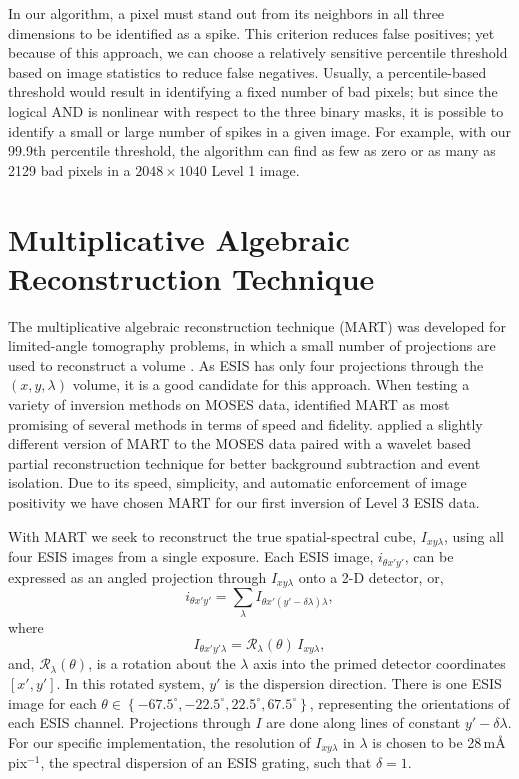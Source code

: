 \documentclass[linenumbers,trackchanges]{aastex63}
\begin{document}
In our algorithm, a pixel must stand out from its neighbors in all three dimensions to be identified as a spike.
This criterion reduces false positives; yet because of this approach, we can choose a relatively sensitive percentile threshold based on image statistics to reduce false negatives. 
Usually, a percentile-based threshold would result in identifying a fixed number of bad pixels; but since the logical AND is nonlinear with respect to the three binary masks, it is possible to identify a small or large number of spikes in a given image. 
For example, with our 99.9th percentile threshold, the algorithm can find as few as zero or as many as 2129 bad pixels in a $2048\times 1040$ Level 1 image.

    	\section{Multiplicative Algebraic Reconstruction Technique}\label{MART}
   	The multiplicative algebraic reconstruction technique (MART) was developed for limited-angle tomography problems, in which a small number of projections are used to reconstruct a volume \citep{Okamoto1991,Verhoeven1993}. 
As ESIS has only four projections through the $(x,y,\lambda)$ volume, it is a good candidate for this approach.
When testing a variety of inversion methods on MOSES data, \citet{Fox2011} identified MART as most promising of several methods in terms of speed and fidelity.
\citet{Rust2017} applied a slightly different version of MART to the MOSES data paired with a wavelet based partial reconstruction technique for better background subtraction and event isolation.
Due to its speed, simplicity, and automatic enforcement of image positivity we have chosen MART for our first inversion of Level 3 ESIS data.


With MART we seek to reconstruct the true spatial-spectral cube, $I_{xy\lambda}$, using all four ESIS images from a single exposure.
Each ESIS image, $i_{\theta x'y'}$, can be expressed as an angled projection through $I_{xy\lambda}$ onto a 2-D detector, or,
\begin{equation}
i_{\theta x'y'} = \sum_\lambda I_{\theta x'(y'-\delta\lambda)\lambda},
\end{equation}
where
\begin{equation}
I_{\theta x'y'\lambda} = \mathcal{R}_\lambda(\theta)\,I_{xy\lambda},
\end{equation} 
and, $\mathcal{R}_\lambda (\theta)$, is a rotation about the $\lambda$ axis into the primed detector coordinates $[x',y']$. 
In this rotated system, $y'$ is the dispersion direction.
There is one ESIS image for each $\theta \in \left\{ -67.5^{\circ}, -22.5^{\circ}, 22.5^{\circ},67.5^{\circ} \right\}$, representing the  orientations of each ESIS channel.
Projections through $I$ are done along lines of constant $y'-\delta\lambda$.
For our specific implementation, the resolution of $I_{xy\lambda}$ in $\lambda$ is chosen to be 28\,m\AA\,pix$^{-1}$, the spectral dispersion of an ESIS grating, such that $\delta = 1$. 
\end{document}
